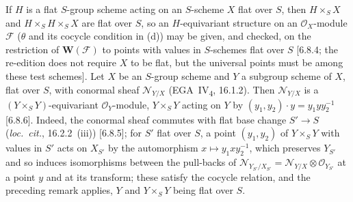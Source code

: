If \(H\) is a flat \(S\)-group scheme acting on an \(S\)-scheme \(X\) flat
over \(S\), then \(H\times_SX\) and \(H\times_SH\times_SX\) are flat over
\(S\), so an \(H\)-equivariant structure on an \(\mathcal O_X\)-module
\(\mathscr F\) (\(\theta\) and its cocycle condition in (d)) may be given,
and checked, on
the restriction of \(\mathbf W(\mathscr F)\) to points with values in
\(S\)-schemes flat over \(S\) [6.8.4; the re-edition does not require \(X\)
to be flat, but the universal points must be among these test schemes].
Let \(X\) be an \(S\)-group scheme and \(Y\) a subgroup scheme of \(X\),
flat over \(S\), with conormal sheaf \(\mathscr N_{Y/X}\) (EGA~IV\textsubscript{4},
16.1.2). Then \(\mathscr N_{Y/X}\) is a \((Y\times_SY)\)-equivariant
\(\mathcal O_Y\)-module, \(Y\times_SY\) acting on \(Y\) by
\((y_1,y_2)\cdot y=y_1yy_2^{-1}\) [6.8.6]. Indeed, the conormal sheaf
commutes with flat base change \(S'\to S\) (\textit{loc.\ cit.},
16.2.2~(iii)) [6.8.5]; for \(S'\) flat over \(S\), a point \((y_1,y_2)\) of
\(Y\times_SY\) with values in \(S'\) acts on \(X_{S'}\) by the automorphism
\(x\mapsto y_1xy_2^{-1}\), which preserves \(Y_{S'}\) and so induces
isomorphisms between the pull-backs of
\(\mathscr N_{Y_{S'}/X_{S'}}=\mathscr N_{Y/X}\otimes\mathcal O_{Y_{S'}}\) at a
point \(y\) and at its transform; these satisfy the cocycle relation, and
the preceding remark applies, \(Y\) and \(Y\times_SY\) being flat over
\(S\).
\par\medskip

